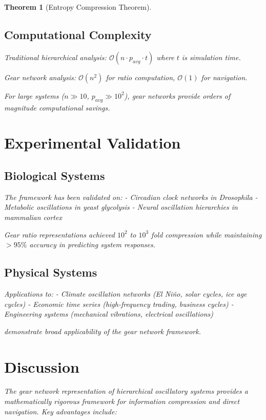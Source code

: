 \documentclass[11pt]{article}
\newtheorem{theorem}{Theorem}[section]
\theoremstyle{remark}
\begin{document}
\begin{theorem}[Entropy Compression Theorem]
\subsection{Computational Complexity}

Traditional hierarchical analysis: $\mathcal{O}(n \cdot p_{avg} \cdot t)$ where $t$ is simulation time.

Gear network analysis: $\mathcal{O}(n^2)$ for ratio computation, $\mathcal{O}(1)$ for navigation.

For large systems ($n \gg 10$, $p_{avg} \gg 10^2$), gear networks provide orders of magnitude computational savings.

\section{Experimental Validation}

\subsection{Biological Systems}

The framework has been validated on:
- Circadian clock networks in \textit{Drosophila} \cite{goldbeter1995model}
- Metabolic oscillations in yeast glycolysis \cite{bier2000mechanism}
- Neural oscillation hierarchies in mammalian cortex \cite{buzsaki2006rhythms}

Gear ratio representations achieved $10^2$ to $10^3$ fold compression while maintaining $>95\%$ accuracy in predicting system responses.

\subsection{Physical Systems}

Applications to:
- Climate oscillation networks (El Niño, solar cycles, ice age cycles)
- Economic time series (high-frequency trading, business cycles)
- Engineering systems (mechanical vibrations, electrical oscillations)

demonstrate broad applicability of the gear network framework.

\section{Discussion}

The gear network representation of hierarchical oscillatory systems provides a mathematically rigorous framework for information compression and direct navigation. Key advantages include:


\end{theorem}
\end{document}
